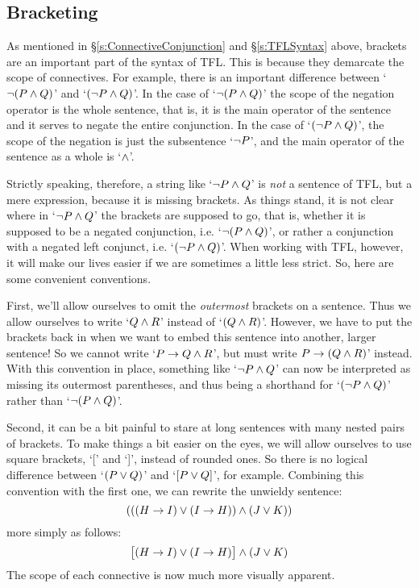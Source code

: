 \subsection{Bracketing}\label{s:TFLBracketing}

As mentioned in \S\ref{s:ConnectiveConjunction} and \S\ref{s:TFLSyntax} above, brackets are an important part of the syntax of TFL.  This is because they demarcate the scope of connectives.  For example, there is an important difference between `$\neg (P \wedge Q)$' and `$(\neg P \wedge Q)$'.  In the case of  `$\neg (P \wedge Q)$' the scope of the negation operator is the whole sentence, that is, it is the main operator of the sentence and it serves to negate the entire conjunction. In the case of `$(\neg P \wedge Q)$', the scope of the negation is just the subsentence `$\neg P$', and the main operator of the sentence as a whole is `$\wedge$'.

Strictly speaking, therefore, a string like `$\neg P \wedge Q$' is \emph{not} a sentence of TFL, but a mere expression, because it is missing brackets.  As things stand, it is not clear where in `$\neg P \wedge Q$' the brackets are supposed to go, that is, whether it is supposed to be a negated conjunction, i.e. `$\neg (P \wedge Q)$', or rather a conjunction with a negated left conjunct, i.e.  `$(\neg P \wedge Q)$'.  When working with TFL, however, it will make our lives easier if we are sometimes a little less strict. So, here are some convenient conventions.

First,  we'll allow ourselves to omit the \emph{outermost} brackets on a sentence. Thus we allow ourselves to write `$Q \wedge R$' instead of `$(Q \wedge R)$'. However, we have to put the brackets back in when we want to embed this sentence into another, larger sentence!  So we cannot write `$P \rightarrow Q \wedge R$', but must write $P \rightarrow (Q \wedge R)$' instead.  With this convention in place, something like `$\neg P \wedge Q$' can now be interpreted as missing its outermost parentheses, and thus being a shorthand for `$(\neg P \wedge Q)$' rather than `$\neg (P \wedge Q)$'.

Second, it can be a bit painful to stare at long sentences with many nested pairs of brackets. To make things a bit easier on the eyes, we will allow ourselves to use square brackets, `[' and `]', instead of rounded ones. So there is no logical difference between `$(P\vee Q)$' and `$[P\vee Q]$', for example. Combining this convention with the first one, we can rewrite the unwieldy sentence:
$$(((H \rightarrow I) \vee (I \rightarrow H)) \wedge (J \vee K))$$
more simply as follows:
$$\bigl[(H \rightarrow I) \vee (I \rightarrow H)\bigr] \wedge (J \vee K)$$
The scope of each connective is now much more visually apparent.

